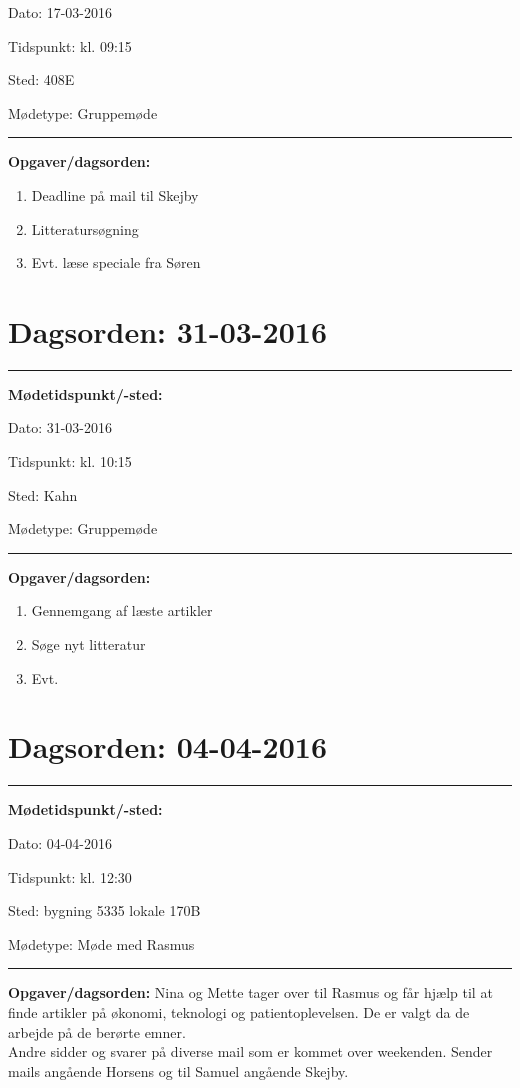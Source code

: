 Dato: \tabto{7em} 17-03-2016

Tidspunkt: \tabto{7em} kl. 09:15 

Sted: \tabto{7em} 408E

Mødetype: \tabto{7em} Gruppemøde \newline


\hrule
\textbf{Opgaver/dagsorden:} \newline
\begin{enumerate}
	\item Deadline på mail til Skejby 
	\item Litteratursøgning 
	\item Evt. læse speciale fra Søren
\end{enumerate}

\section{Dagsorden: 31-03-2016 }
\hrule
\textbf{Mødetidspunkt/-sted:} 

Dato: \tabto{7em} 31-03-2016

Tidspunkt: \tabto{7em} kl. 10:15 

Sted: \tabto{7em} Kahn

Mødetype: \tabto{7em} Gruppemøde \newline


\hrule
\textbf{Opgaver/dagsorden:} \newline
\begin{enumerate}
	\item Gennemgang af læste artikler 
	\item Søge nyt litteratur 
	\item Evt. 
\end{enumerate}

\newpage 
\section{Dagsorden: 04-04-2016 }
\hrule
\textbf{Mødetidspunkt/-sted:} 

Dato: \tabto{7em} 04-04-2016

Tidspunkt: \tabto{7em} kl. 12:30 

Sted: \tabto{7em} bygning 5335 lokale 170B

Mødetype: \tabto{7em} Møde med Rasmus \newline


\hrule
\textbf{Opgaver/dagsorden:} \newline
Nina og Mette tager over til Rasmus og får hjælp til at finde artikler på økonomi, teknologi og patientoplevelsen. De er valgt da de arbejde på de berørte emner. \\
Andre sidder og svarer på diverse mail som er kommet over weekenden. Sender mails angående Horsens og til Samuel angående Skejby. 

